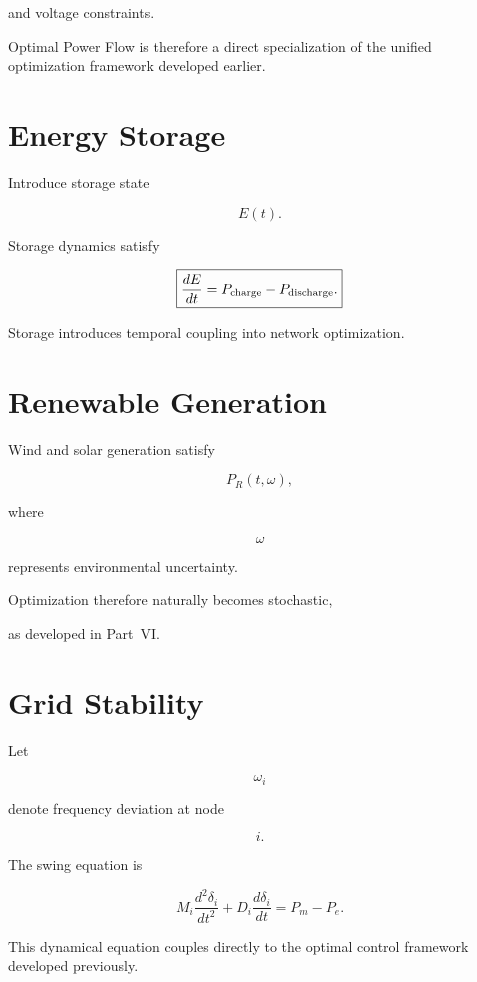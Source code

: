 \documentclass[11pt,fleqn]{book}
\numberwithin{equation}{chapter}
\theoremstyle{plain}
\theoremstyle{definition}
\theoremstyle{remark}
\begin{document}
and voltage constraints.

Optimal Power Flow is therefore a direct specialization of the unified
optimization framework developed earlier.


\section{Energy Storage}

Introduce storage state

\[
E(t).
\]

Storage dynamics satisfy

\[
\boxed{
\frac{dE}{dt}
=
P_{\rm charge}
-
P_{\rm discharge}.
}
\]

Storage introduces temporal coupling into network optimization.


\section{Renewable Generation}

Wind and solar generation satisfy

\[
P_R(t,\omega),
\]

where

\[
\omega
\]

represents environmental uncertainty.

Optimization therefore naturally becomes stochastic,

as developed in Part~VI.


\section{Grid Stability}

Let

\[
\omega_i
\]

denote frequency deviation at node

\[
i.
\]

The swing equation is

\[
M_i
\frac{d^2\delta_i}{dt^2}
+
D_i
\frac{d\delta_i}{dt}
=
P_m-P_e.
\]

This dynamical equation couples directly to the optimal control
framework developed previously.
\end{document}
